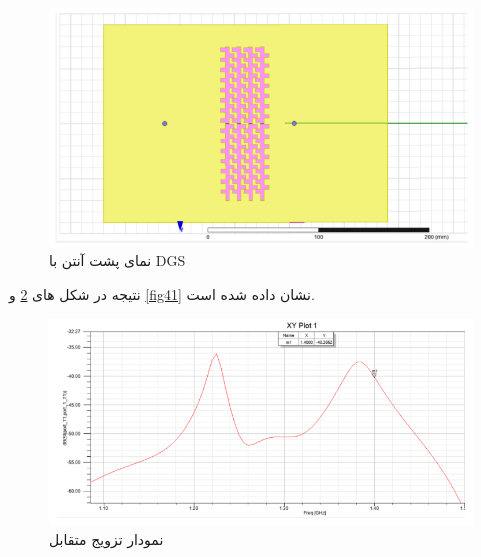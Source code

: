 \begin{figure}
	\centering
	\includegraphics[scale=0.5]{Images/fig39.png}
	\caption{نمای پشت آنتن با DGS}
	\label{fig39}
\end{figure}

 نتیجه در شکل های 
\ref{fig40}
و
\ref{fig41}
نشان داده شده است.

\begin{figure}
	\centering
	\includegraphics[scale=0.5]{Images/fig40.png}
	\caption{نمودار تزویج متقابل}
	\label{fig40}
\end{figure}


